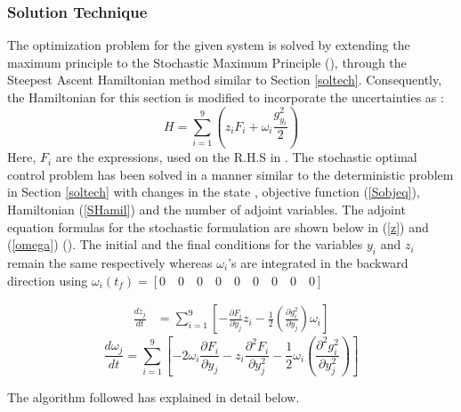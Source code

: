 \documentclass[3p,times,authoryear]{elsarticle}
\begin{document}
\subsubsection{Solution Technique}
The optimization problem for the given system is solved by extending the maximum principle to the Stochastic Maximum Principle (\cite{ramirez}), through the Steepest Ascent Hamiltonian method similar to Section \ref{soltech}. Consequently, the Hamiltonian for this section is modified to incorporate the uncertainties as :
\begin{equation}
H = \sum_{i=1}^{9} \left( z_{i}F_{i} + \omega_{i}\frac{g_{y_{i}}^2}{2} \right) \label{SHamil}
\end{equation}
Here, $F_{i}$ are the expressions, used on the R.H.S in . The stochastic optimal control problem has been solved in a manner similar to the deterministic problem in Section \ref{soltech} with changes in the state , objective function (\ref{Sobjeq}), Hamiltonian (\ref{SHamil}) and the number of adjoint variables. The adjoint equation formulas for the stochastic formulation are shown below in (\ref{z}) and (\ref{omega}) (\cite{yenkie}). The initial and the final conditions for the variables $y_{i}$ and $z_{i}$ remain the same respectively whereas $\omega_{i}$'s are integrated in the backward direction using $\omega_{i}(t_{f}) = \left[  0 \quad 0 \quad 0 \quad 0 \quad 0 \quad 0 \quad 0 \quad 0 \quad 0 \right]$ 

\begin{align}
\frac{dz_{j}}{dt} &= \sum_{i=1}^{9} \left[ - \frac{\partial F_{i}}{\partial y_{j}} z_{i} - \frac{1}{2} \left(\frac{\partial g_{i}^{2}}{\partial y_{j}}\right)\omega_{i} \right] \label{z}
\end{align}
\begin{equation}
\frac{d \omega_{j}}{dt} = \sum_{i=1}^{9} \left[ -2 \omega_{i} \frac{\partial F_{i}}{\partial y_{j}} - z_{i} \frac{\partial^{2} F_{i}}{\partial y_{j}^{2}} - \frac{1}{2} \omega_{i} \left( \frac{\partial^{2} g_{i}^{2}}{\partial y_{j}^{2}} \right) \right] \label{omega} 
\end{equation}
%

The algorithm followed has explained in detail below. 
\end{document}
